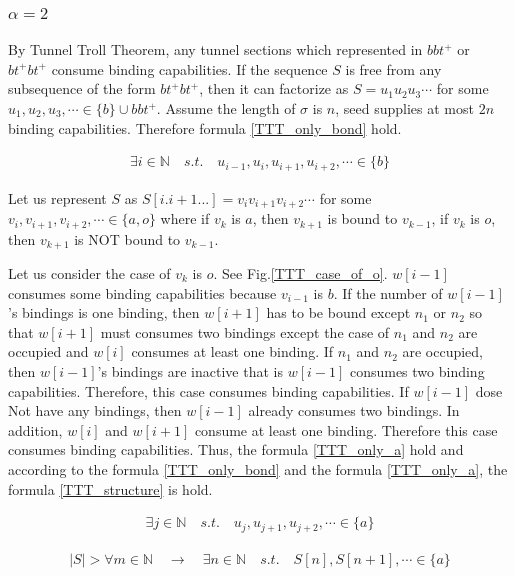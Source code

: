 \documentclass[runningheads]{llncs}
\begin{document}
\subsubsection{$\alpha = 2$}


By Tunnel Troll Theorem, any tunnel sections which represented in $bbt^+$ or $bt^+bt^+$ consume binding capabilities. If the sequence $S$ is free from any subsequence of the form $bt^+bt^+$, then it can factorize as $S = u_1 u_2 u_3 \cdots$ for some $u_1 , u_2 , u_3 , \cdots \in \{b\} \cup bbt^+$. Assume the length of $\sigma$ is $n$, seed supplies at most $2n$ binding capabilities. Therefore formula \ref{TTT_only_bond} hold.

\begin{eqnarray}
  \exists i \in \mathbb{N} \quad s.t. \quad u_{i-1} , u_i , u_{i+1} , u_{i+2} , \cdots \in \{ b \}
  \label{TTT_only_bond}
\end{eqnarray}


Let us represent $S$ as $S[i.i+1...] = v_i v_{i+1} v_{i+2} \cdots$ for some $v_i, v_{i+1}, v_{i+2}, \cdots \in \{ a, o\}$ where if $v_k$ is $a$, then $v_{k+1}$ is bound to $v_{k-1}$, if $v_k$ is $o$, then $v_{k+1}$ is NOT bound to $v_{k-1}$.


Let us consider the case of $v_k$ is $o$. See Fig.\ref{TTT_case_of_o}. $w[i-1]$ consumes some binding capabilities because $v_{i-1}$ is $b$. If the number of $w[i-1]$'s bindings is one binding, then $w[i+1]$ has to be bound except $n_1$ or $n_2$ so that $w[i+1]$ must consumes two bindings except the case of $n_1$ and $n_2$ are occupied and $w[i]$ consumes at least one binding. If $n_1$ and $n_2$ are occupied, then $w[i-1]$'s bindings are inactive that is $w[i-1]$ consumes two binding capabilities. Therefore, this case consumes binding capabilities. If $w[i-1]$ dose Not have any bindings, then $w[i-1]$ already consumes two bindings. In addition, $w[i]$ and $w[i+1]$ consume at least one binding. Therefore this case consumes binding capabilities. Thus, the formula \ref{TTT_only_a} hold and according to the formula \ref{TTT_only_bond} and the formula \ref{TTT_only_a}, the formula \ref{TTT_structure} is hold.

\begin{eqnarray}
  \exists j \in \mathbb{N} \quad s.t. \quad u_j , u_{j+1} , u_{j+2} , \cdots \in \{ a \}
  \label{TTT_only_a}
\end{eqnarray}

\begin{eqnarray}
  | S | > \forall m \in \mathbb{N} \quad \to \quad \exists n \in \mathbb{N} \quad s.t. \quad S[n], S[n+1], \cdots \in \{ a \}
  \label{TTT_structure}
\end{eqnarray}
\end{document}
